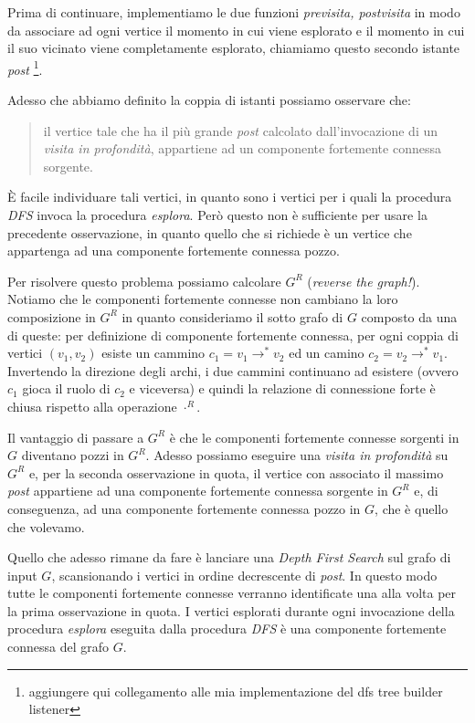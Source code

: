 Prima di continuare, implementiamo le due funzioni \emph{previsita,
  postvisita} in modo da associare ad ogni vertice il momento in cui
viene esplorato e il momento in cui il suo vicinato viene
completamente esplorato, chiamiamo questo secondo istante \emph{post}
\footnote{aggiungere qui collegamento alle mia implementazione del dfs
  tree builder listener}.

Adesso che abbiamo definito la coppia di istanti possiamo osservare
che: 
\begin{quotation}
  il vertice tale che ha il pi\`u grande \emph{post} calcolato
  dall'invocazione di un \emph{visita in profondit\`a}, appartiene ad un
  componente fortemente connessa sorgente.
\end{quotation}

\`E facile individuare tali vertici, in quanto sono i vertici per i
quali la procedura \emph{DFS} invoca la procedura
\emph{esplora}. Per\`o questo non \`e sufficiente per usare la
precedente osservazione, in quanto quello che si richiede \`e un
vertice che appartenga ad una componente fortemente connessa pozzo.

Per risolvere questo problema possiamo calcolare $G^{R}$
(\emph{reverse the graph!}). Notiamo che le componenti fortemente
connesse non cambiano la loro composizione in $G^{R}$ in quanto
consideriamo il sotto grafo di $G$ composto da una di queste: per
definizione di componente fortemente connessa, per ogni coppia di
vertici $(v_{1}, v_{2})$ esiste un cammino $c_{1} =
v_{1}\rightarrow^{*} v_{2}$ ed un camino $c_{2} = v_{2}\rightarrow^{*}
v_{1}$. Invertendo la direzione degli archi, i due cammini continuano
ad esistere (ovvero $c_{1}$ gioca il ruolo di $c_{2}$ e viceversa) e
quindi la relazione di connessione forte \`e chiusa rispetto alla
operazione $\cdot ^{R}$.

Il vantaggio di passare a $G^{R}$ \`e che le componenti fortemente
connesse sorgenti in $G$ diventano pozzi in $G^{R}$. Adesso possiamo
eseguire una \emph{visita in profondit\`a} su $G^{R}$ e, per la
seconda osservazione in quota, il vertice con associato il massimo
\emph{post} appartiene ad una componente fortemente connessa sorgente in
$G^{R}$ e, di conseguenza, ad una componente fortemente connessa pozzo
in $G$, che \`e quello che volevamo.

Quello che adesso rimane da fare \`e lanciare una \emph{Depth First
  Search} sul grafo di input $G$, scansionando i vertici in ordine
decrescente di \emph{post}. In questo modo tutte le componenti
fortemente connesse verranno identificate una alla volta per la prima
osservazione in quota. I vertici esplorati durante ogni invocazione
della procedura \emph{esplora} eseguita dalla procedura \emph{DFS} \`e
una componente fortemente connessa del grafo $G$.

